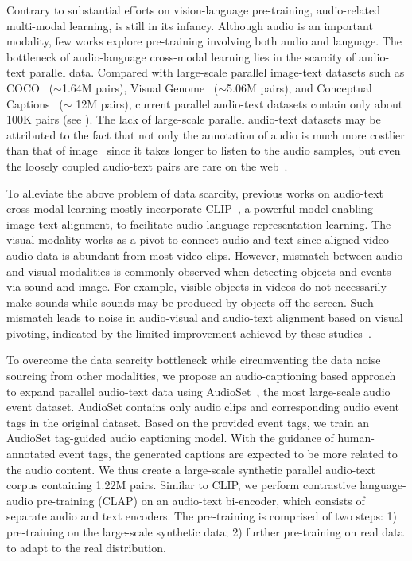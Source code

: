 \documentclass[sigconf,anonymous,review]{acmart}
\begin{document}
Contrary to substantial efforts on vision-language pre-training, 
audio-related multi-modal learning, is still in its infancy. 
Although audio is an important modality, few works explore pre-training involving both audio and language.
The bottleneck of audio-language cross-modal learning lies in the 
scarcity of audio-text parallel data.
Compared with large-scale parallel image-text datasets such as COCO~\cite{lin2014microsoft} ($\sim$1.64M pairs), Visual Genome~\cite{krishna2017visual} ($\sim$5.06M pairs), and Conceptual Captions~\cite{sharma2018conceptual} ($\sim$ 12M pairs), current parallel audio-text datasets contain only about 100K pairs (see ).
The lack of large-scale parallel audio-text datasets may be attributed to the 
fact that not only the annotation of audio is much more costlier than 
that of image~\cite{zhang2021enriching} since it takes longer to listen
to the audio samples, but even the loosely coupled audio-text pairs are rare 
on the web~\cite{zhao2021connecting}.

To alleviate the above problem of data scarcity, previous works on 
audio-text cross-modal learning mostly incorporate 
CLIP~\cite{radford2021learning}, a powerful model enabling image-text 
alignment, to facilitate audio-language representation learning.
The visual modality works as a pivot to connect audio and text since 
aligned video-audio data is abundant from most video clips.
However, mismatch between audio and visual modalities is commonly observed when detecting objects and events via sound and image.
For example, visible objects in videos do not necessarily make sounds while sounds may be produced by objects off-the-screen.
Such mismatch leads to noise in audio-visual and audio-text alignment based on visual pivoting, indicated by the limited improvement achieved by these studies~\cite{guzhov2021audioclip,zhao2021connecting,wu2021wav2clip}.%

To overcome the data scarcity bottleneck while circumventing the data noise sourcing from other modalities, we propose an audio-captioning based approach to expand parallel audio-text data using AudioSet~\cite{gemmeke2017audio}, the most large-scale audio event dataset.
AudioSet contains only audio clips and corresponding audio event tags in the original dataset.
Based on the provided event tags, we train an AudioSet tag-guided audio captioning model.
With the guidance of human-annotated event tags, the generated captions are expected to be more related to the audio content. 
We thus create a large-scale synthetic parallel audio-text corpus containing 1.22M pairs.
Similar to CLIP, we perform contrastive language-audio pre-training (CLAP) on an audio-text bi-encoder, which consists of separate audio and text encoders.
The pre-training is comprised of two steps: 1) pre-training on the large-scale synthetic data; 2) further pre-training on real data to adapt to the real distribution.
\end{document}
